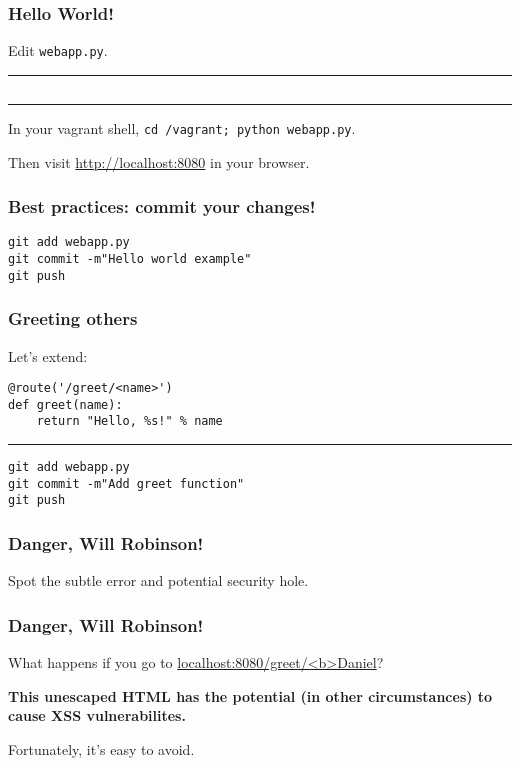 \documentclass{beamer}
\begin{document}
\begin{frame}
  \frametitle{Hello World!}
  Edit \texttt{webapp.py}.
\hrule
  \inputminted{python}{../steps/01-hello-world/01-webapp.py}
\hrule
In your vagrant shell, \texttt{cd /vagrant; python webapp.py}.

Then visit \url{http://localhost:8080} in your browser.
\end{frame}

\begin{frame}
\frametitle{Best practices: commit your changes!}
\texttt{git add webapp.py}\\
\texttt{git commit -m"Hello world example"}\\
\texttt{git push}
\end{frame}

\begin{frame}[fragile]
  \frametitle{Greeting others}
  Let's extend:
  \begin{verbatim}
@route('/greet/<name>')
def greet(name):
    return "Hello, %s!" % name
  \end{verbatim}

  \hrule
  \texttt{git add webapp.py}\\
  \texttt{git commit -m"Add greet function"}\\
  \texttt{git push}
\end{frame}

\begin{frame}
  \frametitle{Danger, Will Robinson!}
  Spot the subtle error and potential security hole.
\end{frame}

\begin{frame}
  \frametitle{Danger, Will Robinson!}

  What happens if you go to \url{localhost:8080/greet/<b>Daniel}?

  \textbf{This unescaped HTML has the potential (in other
    circumstances) to cause XSS vulnerabilites.}

  Fortunately, it's easy to avoid.
\end{frame}

\end{document}
